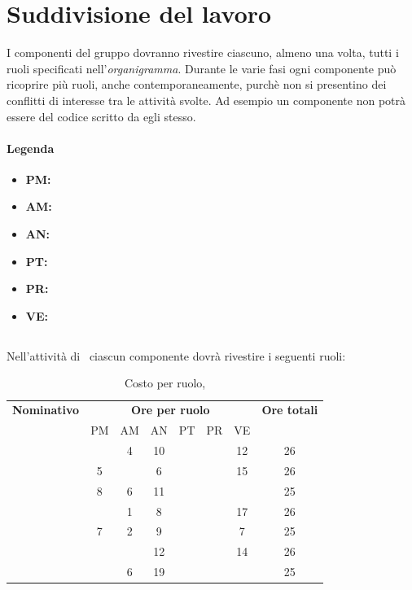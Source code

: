 \newpage
\section{Suddivisione del lavoro}
I componenti del gruppo dovranno rivestire ciascuno, almeno una volta, tutti i ruoli specificati nell'\textit{organigramma}.
Durante le varie fasi ogni componente può ricoprire più ruoli, anche contemporaneamente, purchè non si presentino dei conflitti di interesse tra le attività svolte. Ad esempio un componente non potrà essere \textit{\Ver} del codice scritto da egli stesso.
\paragraph{Legenda}
\begin{itemize}
\item\textbf{PM:} \Pm
\item\textbf{AM:} \Am
\item\textbf{AN:} \An
\item\textbf{PT:} \Prog
\item\textbf{PR:} \Progr
\item\textbf{VE:} \Ver
\end{itemize}
\subsection{\ARM}

Nell'attività di \ARM\ ciascun componente dovrà rivestire i seguenti ruoli:


\begin{table}[h]
	\begin{center}
		\begin{tabular}{|c|c|c|c|c|c|c|c|}
			\hline
			\textbf{Nominativo} & \multicolumn{6}{c|}{\textbf{Ore per ruolo}} & \textbf{Ore totali} \\
					& PM & AM & AN & PT & PR & VE & \\
			\hline
			\FB		&	 &	4 &	10 &  	&	 & 12 &	26	\\
			\hline
			\RM		& 5 &	  &	6  & 	&	 & 15 &	26	\\
			\hline
			\SL		& 8  & 6  &	11 &	 &	 &	  &	25	\\
			\hline
			\DC		&	 & 1  &	8  &	&	 & 17 &	26	\\
			\hline
			\LD 	& 7	 & 2  &	9 &	&	 & 7  &	25	\\
			\hline
			\MT		& 	 &    &	12 &	 &	 & 14 &	26	\\
			\hline
			\ND 	&	 & 6  &	19 & &	 &	  & 25	\\
			\hline
		\end{tabular}
	\end{center}
	\caption{Costo per ruolo, \ARM}
\end{table}

